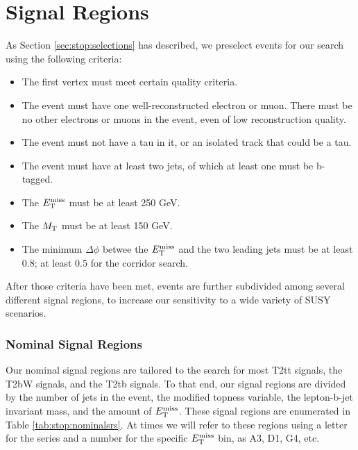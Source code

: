 \section{Signal Regions}
\label{sec:stop:sigregs}

As Section \ref{sec:stop:selections} has described, we preselect events
for our search using the following criteria:
\begin{itemize}
\item The first vertex must meet certain quality criteria.
\item The event must have one well-reconstructed electron or
  muon. There must be no other electrons or muons in the event, even
  of low reconstruction quality.
\item The event must not have a tau in it, or an isolated track that
  could be a tau.
\item The event must have at least two jets, of which at least one
  must be b-tagged.
\item The $E_\text{T}^\text{miss}$ must be at least 250 GeV.
\item The $M_\text{T}$ must be at least 150 GeV.
\item The minimum $\Delta \phi$ betwee the $E_\text{T}^\text{miss}$ and the two leading
  jets must be at least 0.8; at least 0.5 for the corridor search.
\end{itemize}
After those criteria have been met, events are further subdivided
among several different signal regions, to increase our sensitivity to
a wide variety of SUSY scenarios.

\subsubsection*{Nominal Signal Regions}

Our nominal signal regions are tailored to the search for most T2tt
signals, the T2bW signals, and the T2tb signals. To that end, our
signal regions are divided by the number of jets in the event, the
modified topness variable, the lepton-b-jet invariant mass, and the
amount of $E_\text{T}^\text{miss}$. These signal regions are enumerated in Table
\ref{tab:stop:nominalsrs}. At times we will refer to these regions using a
letter for the series and a number for the specific $E_\text{T}^\text{miss}$ bin, as
A3, D1, G4, etc.

